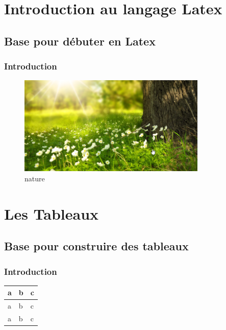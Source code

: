 \documentclass{report}
\begin{document}
\tableofcontents
\part{Introduction au langage Latex}
\chapter{Base pour débuter en Latex}
\section{Introduction}
\lipsum[1-2]
\begin{figure}
    \centering
    \includegraphics[width=0.8\textwidth]{nature.png}
    \caption{nature}
\end{figure}

\part{Les Tableaux}
\chapter{Base pour construire des tableaux}
\section{Introduction}
\lipsum[1-2]
\begin{table}
    \centering
    \begin{tabular}{|l|l|l|}
        \hline
        a & b & c \\
        \hline
        a & b & c \\
        \hline
        a & b & c \\
        \hline
    \end{tabular}
\end{table}
\end{document}
